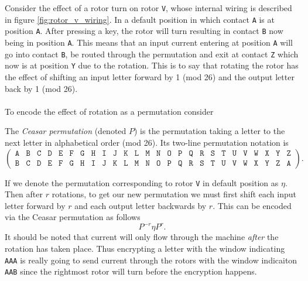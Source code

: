 Consider the effect of a rotor turn on rotor \texttt{V}, whose
internal wiring is described in figure \ref{fig:rotor_v_wiring}.
In a default position in which contact \texttt{A} is at position
\texttt{A}. After pressing a key, the rotor
will turn resulting in contact \texttt{B} now being in position
\texttt{A}. This means that an input current
entering at position \texttt{A} will go into contact \texttt{B}, be
routed through the permutation and exit at contact
\texttt{Z} which now is at position \texttt{Y} due to the rotation.
This is to say that rotating the rotor has the effect
of shifting an input letter forward by 1 (mod 26) and the output
letter back by 1 (mod 26).
\\\\To encode the effect of rotation as a permutation consider
\begin{definition}
  The \emph{Ceasar permutation} (denoted $P$) is the permutation
  taking a letter to the next letter in alphabetical order (mod 26).
  Its two-line permutation notation is
  \[
    \left(
      \begin{array}{llllllllllllllllllllllllll}
        \texttt{A} & \texttt{B} & \texttt{C} & \texttt{D} &
        \texttt{E} & \texttt{F} & \texttt{G} & \texttt{H} &
        \texttt{I} & \texttt{J} & \texttt{K} & \texttt{L} &
        \texttt{M} & \texttt{N} & \texttt{O} & \texttt{P} &
        \texttt{Q} & \texttt{R} & \texttt{S} & \texttt{T} &
        \texttt{U} & \texttt{V} & \texttt{W} & \texttt{X} &
        \texttt{Y} & \texttt{Z}                             \\
        \texttt{B} & \texttt{C} & \texttt{D} &
        \texttt{E} & \texttt{F} & \texttt{G} & \texttt{H} &
        \texttt{I} & \texttt{J} & \texttt{K} & \texttt{L} &
        \texttt{M} & \texttt{N} & \texttt{O} & \texttt{P} &
        \texttt{Q} & \texttt{R} & \texttt{S} & \texttt{T} &
        \texttt{U} & \texttt{V} & \texttt{W} & \texttt{X} &
        \texttt{Y} & \texttt{Z} & \texttt{A}
      \end{array}
    \right).
  \]
\end{definition}
If we denote the permutation corresponding to rotor \texttt{V} in
default position as $\eta$. Then after $r$ rotations, to get
our new permutation we must first shift each input letter forward by
$r$ and each output letter backwards by $r$. This can be encoded via
the Ceasar permutation as follows
\[
  {P^{-r}}\eta{P^{r}}.
\]
\noindent It should be noted that current will only flow through the
machine \emph{after} the rotation has taken place. Thus encrypting a
letter with the window indicating \texttt{AAA} is really going to
send current through the rotors with the window indicaiton
\texttt{AAB} since the rightmost rotor will turn before the encryption happens.
